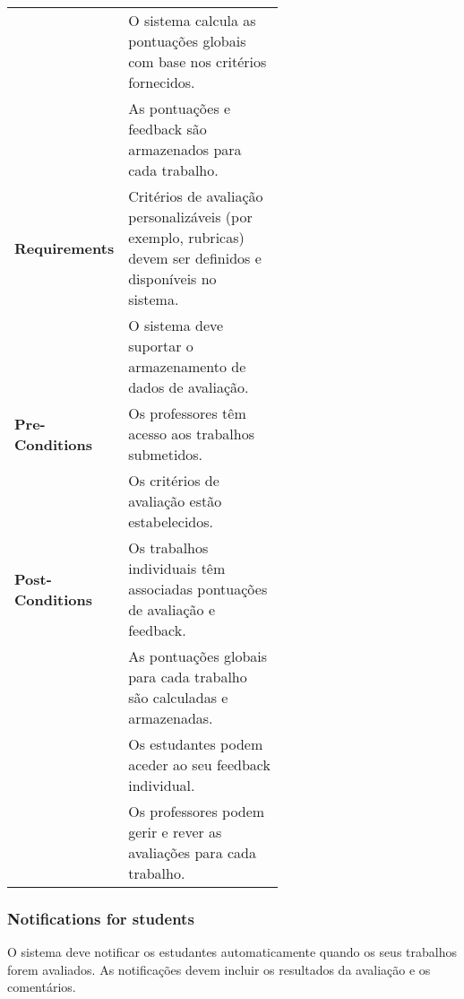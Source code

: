 \documentclass[10pt]{article}
\begin{document}
\begin{table}[H]
\begin{tabular}{|l|p{0.6\linewidth}|}
        & O sistema calcula as pontuações globais com base nos critérios fornecidos. \\
        & As pontuações e feedback são armazenados para cada trabalho. \\
        \hline
        \textbf{Requirements} & Critérios de avaliação personalizáveis (por exemplo, rubricas) devem ser definidos e 
        disponíveis no sistema. \\
        & O sistema deve suportar o armazenamento de dados de avaliação. \\
        \hline
        \textbf{Pre-Conditions} & Os professores têm acesso aos trabalhos submetidos. \\
        & Os critérios de avaliação estão estabelecidos. \\
        \hline
        \textbf{Post-Conditions} & Os trabalhos individuais têm associadas pontuações de avaliação e feedback. \\
        & As pontuações globais para cada trabalho são calculadas e armazenadas. \\
        & Os estudantes podem aceder ao seu feedback individual. \\
        & Os professores podem gerir e rever as avaliações para cada trabalho. \\
        \hline
    \end{tabular}
\end{table}

\newpage

\subsubsection{Notifications for students}
O sistema deve notificar os estudantes automaticamente quando os seus trabalhos forem avaliados. 
As notificações devem incluir os resultados da avaliação e os comentários. 
\end{document}
